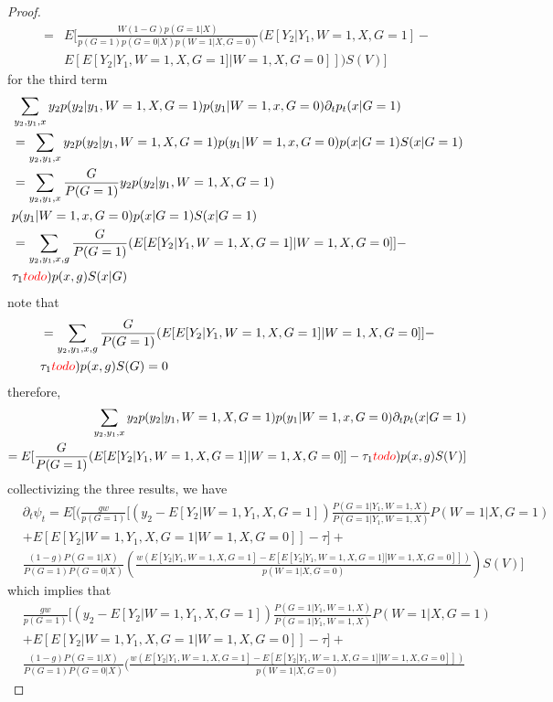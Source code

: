 \documentclass{article}
\begin{document}
\begin{proof}
\begin{align*}
= &E [  \frac{  W ( 1 -G)   p(G =1 | X) }{ p(G=1) p ( G= 0 | X)  p ( W = 1 | X ,G =0) } (E [ Y_2 |   Y_1 ,W = 1, X, G =1 ] -\\
&E [ E[ Y_2 | Y_1 , W =1 , X, G =1 ] | W=1, X, G= 0 ]] )  S(  V) ] 
\end{align*}
for the third term
\begin{align*}
&\sum_ { y_2 ,y_1,x} y_2  p ( y_2| y_1 , W= 1, X , G= 1) p ( y_1 | W =1 , x, G= 0 ) \partial_t p_t( x | G =1 )\\
&= \sum_ { y_2 ,y_1,x} y_2  p ( y_2| y_1 , W= 1, X , G= 1) p ( y_1 | W =1 , x, G= 0 ) p( x | G =1 ) S( x | G= 1) \\
&= \sum_ { y_2 , y_1, x}      \frac{ G } { P(G =1 ) }   y_2  p ( y_2| y_1 , W= 1, X , G= 1)\\
&p ( y_1 | W =1 , x, G= 0 ) p( x | G =1 ) S( x | G= 1) \\
&= \sum_ { y_2 , y_1, x, g}      \frac{ G } { P(G =1 ) }   (E[ E[Y_2| Y_1,  W =1, X, G = 1 ] | W =1 , X, G = 0 ]]  - \\
&\tau_1 {\color{red}todo}) p( x , g ) S( x | G)
\end{align*}
note that
\begin{align*}
&= \sum_ { y_2 , y_1, x, g}      \frac{ G } { P(G =1 ) }   (E[ E[Y_2| Y_1,  W =1, X, G = 1 ] | W =1 , X, G = 0 ]]  - \\
&\tau_1 {\color{red}todo}) p( x , g ) S(  G) = 0
\end{align*}
therefore,
\begin{align*}
\sum_ { y_2 ,y_1,x} y_2  p ( y_2| y_1 , W= 1, X , G= 1) p ( y_1 | W =1 , x, G= 0 ) \partial_t p_t( x | G =1 )\\
= E[      \frac{ G } { P(G =1 ) }   (E[ E[Y_2| Y_1,  W =1, X, G = 1 ] | W =1 , X, G = 0 ]]  - \tau_1 {\color{red}todo}) p( x , g ) S(  V) ]
\end{align*}
collectivizing the three results, we have
\begin{align*}
&\partial_t \psi_t = E [  (\frac{ g w }{ p(G=1) } [ (y_2 - E[ Y_2 | W=1 , Y_1 , X, G =1]  ) \frac{ P( G =1 | Y_1 , W=1 , X ) }{ P(G=1 | Y_1 , W=1 , X ) } P( W=1 |X ,G=1) \\
& + E [ E[ Y_2 | W = 1, Y_1 , X, G =1 | W =1, X, G= 0 ] ] - \tau    ]  + \\
&\frac{ (1- g) P(G = 1|X)   }{ P(G= 1) P ( G =0 |X) } ( \frac{ w ( E [ Y _ 2 | Y_1,W =1 , X, G =1 ] - E [ E[ Y_2 | Y_1, W=1, X, G=1 ] | W =1, X, G= 0 ] ] ) }{ p ( W =1| X, G =0 ) } )S(V) ] 
\end{align*}
which implies that
\begin{align*}
&\frac{ g w }{ p(G=1) } [ (y_2 - E[ Y_2 | W=1 , Y_1 , X, G =1]  ) \frac{ P( G =1 | Y_1 , W=1 , X ) }{ P(G=1 | Y_1 , W=1 , X ) } P( W=1 | X , G=1) \\
&+ E [ E[ Y_2 | W= 1,Y_1 , X, G =1 | W =1, X, G= 0 ] ] - \tau    ]  + \\
&\frac{ (1- g) P(G = 1|X)   }{ P(G= 1) P ( G =0 |X) } ( \frac{ w ( E [ Y _ 2 | Y_1,W =1 , X, G =1 ] - E [ E[ Y_2 | Y_1, W=1, X, G=1 ] | W =1, X, G= 0 ] ] ) }{ p (W =1| X, G =0 ) }
\end{align*}

\end{proof}
\end{document}
